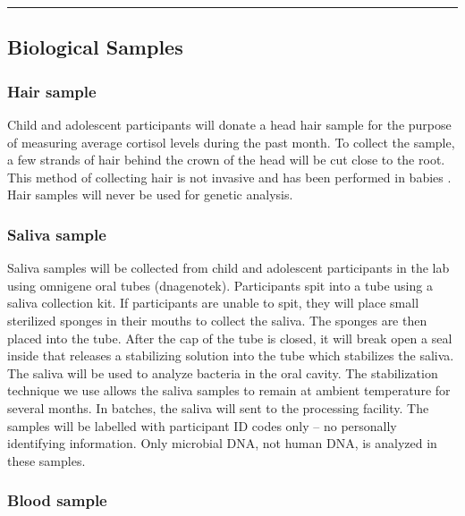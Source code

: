 \documentclass[]{book}
\begin{document}
\begin{center}\rule{0.5\linewidth}{0.5pt}\end{center}

\hypertarget{biological-samples}{%
\subsection{Biological Samples}\label{biological-samples}}

\hypertarget{hair-sample}{%
\subsubsection{Hair sample}\label{hair-sample}}

Child and adolescent participants will donate a head hair sample for the purpose of measuring average cortisol levels during the past month. To collect the sample, a few strands of hair behind the crown of the head will be cut close to the root. This method of collecting hair is not invasive and has been performed in babies \citep[32 weeks of age;][]{staufenbiel_2013}. Hair samples will never be used for genetic analysis.

\hypertarget{saliva-sample}{%
\subsubsection{Saliva sample}\label{saliva-sample}}

Saliva samples will be collected from child and adolescent participants in the lab using omnigene oral tubes (dnagenotek). Participants spit into a tube using a saliva collection kit. If participants are unable to spit, they will place small sterilized sponges in their mouths to collect the saliva. The sponges are then placed into the tube. After the cap of the tube is closed, it will break open a seal inside that releases a stabilizing solution into the tube which stabilizes the saliva. The saliva will be used to analyze bacteria in the oral cavity. The stabilization technique we use allows the saliva samples to remain at ambient temperature for several months. In batches, the saliva will sent to the processing facility. The samples will be labelled with participant ID codes only -- no personally identifying information. Only microbial DNA, not human DNA, is analyzed in these samples.

\hypertarget{blood-sample}{%
\subsubsection{Blood sample}\label{blood-sample}}
\end{document}
